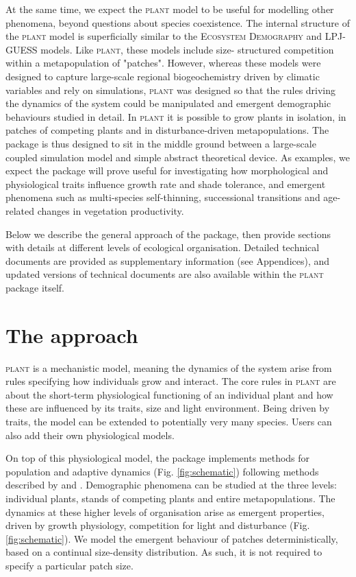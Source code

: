 \documentclass[a4paper,11pt]{article}
\newcommand{\plant}{\textsc{plant}}
\begin{document}
At the same time, we expect the {\plant} model to be useful for modelling
other  phenomena, beyond questions about species coexistence. The internal
structure  of the {\plant} model is superficially similar to the
\textsc{Ecosystem Demography}  \citep{Moorcroft-2001}  and \textsc{LPJ-GUESS}
\citep{Smith-2014} models. Like  {\plant}, these models include size-
structured competition within a metapopulation of  "patches". However,
whereas these models were designed to capture large-scale regional
biogeochemistry driven by climatic variables and rely on simulations,
{\plant} was designed so that the rules  driving the dynamics of the system
could be manipulated and emergent demographic  behaviours studied in detail.
In {\plant} it is possible to grow plants in isolation, in patches of
competing plants and in disturbance-driven metapopulations. The package is
thus designed to sit in the middle ground between a large-scale coupled
simulation model and simple abstract theoretical device. As examples, we
expect the package will prove  useful for investigating how morphological and
physiological traits influence growth rate and shade tolerance, and emergent
phenomena such as multi-species self-thinning,  successional transitions and
age-related changes in vegetation productivity.

Below we describe the general approach of the package, then provide  sections
with details at different levels of ecological organisation.  Detailed
technical documents are provided as supplementary information  (see
Appendices), and updated versions of technical documents are also available
within the {\plant} package itself.

\section{The approach}

{\plant} is a mechanistic model, meaning the dynamics of the system
arise from rules specifying how individuals grow and interact.  The
core rules in {\plant} are about the short-term physiological
functioning of an individual plant and how these are influenced by its
traits, size and light environment. Being driven by traits, the model can be extended to potentially 
very many species. Users can also  add their own physiological models. 

On top of this physiological model, the package implements methods for
population and adaptive dynamics (Fig.  \ref{fig:schematic}) following methods
described by \citet{Falster-2011} and \citet{Falster-2015}. Demographic
phenomena can be studied at the three levels: individual plants, stands of
competing plants and entire metapopulations. The dynamics at these higher
levels of organisation arise as emergent properties, driven by growth
physiology, competition for light and disturbance (Fig.  \ref{fig:schematic}).
We model the emergent behaviour of patches deterministically, based on a
continual  size-density distribution. As such, it is not required to specify a
particular patch size.
\end{document}
